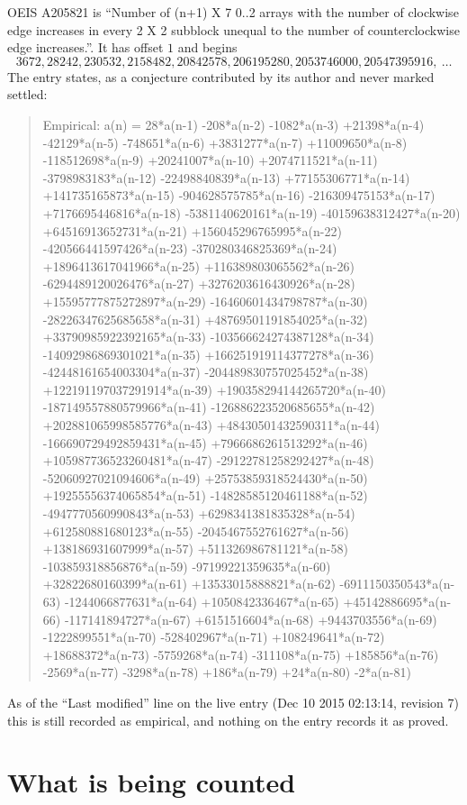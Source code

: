 \documentclass[11pt,a4paper]{article}
\theoremstyle{plain}
\theoremstyle{definition}
\begin{document}
OEIS A205821 is ``Number of (n+1) X 7 0..2 arrays with the number of clockwise edge increases in every 2 X 2 subblock unequal to the number of counterclockwise edge increases.''. It has offset $1$ and begins
\[
3672, 28242, 230532, 2158482, 20842578, 206195280, 2053746000, 20547395916,\ \dots
\]
The entry states, as a conjecture contributed by its author and never marked settled:
\begin{quote}
Empirical: a(n) = 28*a(n-1) -208*a(n-2) -1082*a(n-3) +21398*a(n-4) -42129*a(n-5) -748651*a(n-6) +3831277*a(n-7) +11009650*a(n-8) -118512698*a(n-9) +20241007*a(n-10) +2074711521*a(n-11) -3798983183*a(n-12) -22498840839*a(n-13) +77155306771*a(n-14) +141735165873*a(n-15) -904628575785*a(n-16) -216309475153*a(n-17) +7176695446816*a(n-18) -5381140620161*a(n-19) -40159638312427*a(n-20) +64516913652731*a(n-21) +156045296765995*a(n-22) -420566441597426*a(n-23) -370280346825369*a(n-24) +1896413617041966*a(n-25) +116389803065562*a(n-26) -6294489120026476*a(n-27) +3276203616430926*a(n-28) +15595777875272897*a(n-29) -16460601434798787*a(n-30) -28226347625685658*a(n-31) +48769501191854025*a(n-32) +33790985922392165*a(n-33) -103566624274387128*a(n-34) -14092986869301021*a(n-35) +166251919114377278*a(n-36) -42448161654003304*a(n-37) -204489830757025452*a(n-38) +122191197037291914*a(n-39) +190358294144265720*a(n-40) -187149557880579966*a(n-41) -126886223520685655*a(n-42) +202881065998585776*a(n-43) +48430501432590311*a(n-44) -166690729492859431*a(n-45) +7966686261513292*a(n-46) +105987736523260481*a(n-47) -29122781258292427*a(n-48) -52060927021094606*a(n-49) +25753859318524430*a(n-50) +19255556374065854*a(n-51) -14828585120461188*a(n-52) -4947770560990843*a(n-53) +6298341381835328*a(n-54) +612580881680123*a(n-55) -2045467552761627*a(n-56) +138186931607999*a(n-57) +511326986781121*a(n-58) -103859318856876*a(n-59) -97199221359635*a(n-60) +32822680160399*a(n-61) +13533015888821*a(n-62) -6911150350543*a(n-63) -1244066877631*a(n-64) +1050842336467*a(n-65) +45142886695*a(n-66) -117141894727*a(n-67) +6151516604*a(n-68) +9443703556*a(n-69) -1222899551*a(n-70) -528402967*a(n-71) +108249641*a(n-72) +18688372*a(n-73) -5759268*a(n-74) -311108*a(n-75) +185856*a(n-76) -2569*a(n-77) -3298*a(n-78) +186*a(n-79) +24*a(n-80) -2*a(n-81)
\end{quote}
As of the ``Last modified'' line on the live entry (Dec 10 2015 02:13:14, revision 7) this is still
recorded as empirical, and nothing on the entry records it as proved.

\section{What is being counted}
\end{document}
